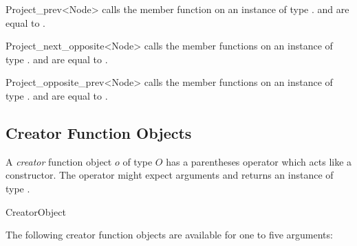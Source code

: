 \ccHtmlNoClassFile
\begin{ccClassTemplate}{Project_prev<Node>}
    {calls the member function  on an instance of type 
      .  and  are equal
      to .}
\end{ccClassTemplate}

\ccHtmlNoClassFile
\begin{ccClassTemplate}{Project_next_opposite<Node>}
    {calls the member functions  on an
      instance of type .  and
       are equal to .}
\end{ccClassTemplate}

\ccHtmlNoClassFile
\begin{ccClassTemplate}{Project_opposite_prev<Node>}
    {calls the member functions  on an
      instance of type .  and
       are equal to .}
\end{ccClassTemplate}


\subsection{Creator Function Objects}
\label{sectionCreatorFunctionObjects}

\ccDefinition 

A {\em creator\/} function object $o$ of type $O$ has a parentheses
operator which acts like a constructor. The operator might expect
arguments and returns an instance of type .


\ccOperations

\ccHtmlNoClassFile
\ccHtmlNoClassLinks
\begin{ccClass}{CreatorObject}
\ccTagFullDeclarations
{}
\ccTagDefaults
\end{ccClass}

\ccCreation

The following creator function objects are available for one to five arguments:

